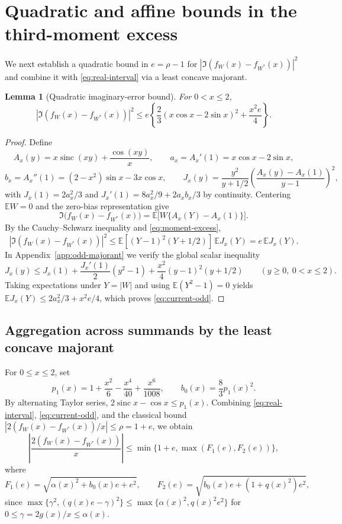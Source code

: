 \documentclass[11pt]{article}
\numberwithin{equation}{section}
\newtheorem{lemma}[theorem]{Lemma}
\theoremstyle{remark}
\DeclareMathOperator{\sinc}{sinc}
\newcommand{\E}{\mathbb E}
\begin{document}
\section{Quadratic and affine bounds in the third-moment excess}
\label{sec:current-scalar}

We next establish a quadratic bound in $e=\rho-1$ for $|\Im(f_W(x)-f_{W^*}(x))|^2$
and combine it with \eqref{eq:real-interval} via a least concave majorant.

\begin{lemma}[Quadratic imaginary-error bound]\label{lem:current-odd}
For $0<x\le2$,
\begin{equation}\label{eq:current-odd}
 |\Im(f_W(x)-f_{W^*}(x))|^2
 \le e\left\{\frac23(x\cos x-2\sin x)^2+\frac{x^2e}{4}\right\}.
\end{equation}
\end{lemma}
\begin{proof}
Define
\[
 A_x(y)=x\sinc(xy)+\frac{\cos(xy)}x,
 \qquad a_x=A_x'(1)=x\cos x-2\sin x,
\]
\[
 b_x=A_x''(1)=(2-x^2)\sin x-3x\cos x,
 \qquad
 J_x(y)=\frac{y^2}{y+1/2}
             \left(\frac{A_x(y)-A_x(1)}{y-1}\right)^2,
\]
with $J_x(1)=2a_x^2/3$ and $J_x'(1)=8a_x^2/9+2a_xb_x/3$ by continuity.
Centering $\E W=0$ and the zero-bias representation give
\[
 \Im\bigl(f_W(x)-f_{W^*}(x)\bigr)=\E\bigl[W\{A_x(Y)-A_x(1)\}\bigr].
\]
By the Cauchy--Schwarz inequality and \eqref{eq:moment-excess},
\[
 |\Im(f_W(x)-f_{W^*}(x))|^2
 \le\E[(Y-1)^2(Y+1/2)]\,\E J_x(Y)=e\,\E J_x(Y).
\]
In Appendix~\ref{app:odd-majorant} we verify the global scalar inequality
\begin{equation}\label{eq:current-J-majorant}
 J_x(y)\le J_x(1)+\frac{J_x'(1)}2(y^2-1)+\frac{x^2}4(y-1)^2(y+1/2)
 \qquad(y\ge0,\ 0<x\le2).
\end{equation}
Taking expectations under $Y=|W|$ and using $\E(Y^2-1)=0$ yields
$\E J_x(Y)\le 2a_x^2/3+x^2e/4$, which proves \eqref{eq:current-odd}.
\end{proof}

\subsection{Aggregation across summands by the least concave majorant}

For $0\le x\le2$, set
\[
 p_1(x)=1+\frac{x^2}6-\frac{x^4}{40}+\frac{x^6}{1008},
 \qquad b_0(x)=\frac83p_1(x)^2.
\]
By alternating Taylor series, $2\sinc x-\cos x\le p_1(x)$. Combining
\eqref{eq:real-interval}, \eqref{eq:current-odd}, and the classical bound
$|2(f_W(x)-f_{W^*}(x))/x|\le\rho=1+e$, we obtain
\begin{equation}\label{eq:current-two-branches}
 \left|\frac{2(f_W(x)-f_{W^*}(x))}{x}\right|
 \le\min\{1+e,\max(F_1(e),F_2(e))\},
\end{equation}
where
\[
 F_1(e)=\sqrt{\alpha(x)^2+b_0(x)e+e^2},\qquad
 F_2(e)=\sqrt{b_0(x)e+(1+q(x)^2)e^2},
\]
since $\max\{\gamma^2,(q(x)e-\gamma)^2\}\le\max\{\alpha(x)^2,q(x)^2e^2\}$ for
$0\le\gamma=2g(x)/x\le\alpha(x)$.
\end{document}
